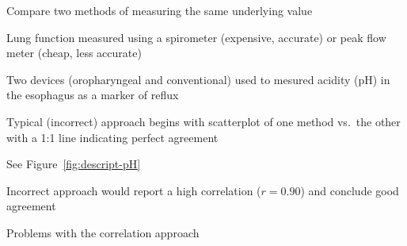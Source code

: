 \bi 
 \item Compare two methods of measuring the same underlying value
  \bi 
  \item Lung function measured using a spirometer (expensive, accurate) or peak flow meter (cheap, less accurate)
  \item Two devices (oropharyngeal and conventional) used to mesured
    acidity (pH) in the esophagus as a marker of reflux
  \ei
 \item Typical (incorrect) approach begins with scatterplot of one
   method vs.\ the other with a 1:1 line indicating perfect agreement
 \item See Figure~\ref{fig:descript-pH}
 \item Incorrect approach would report a high correlation ($r = 0.90$) and conclude good agreement
 \item Problems with the correlation approach
